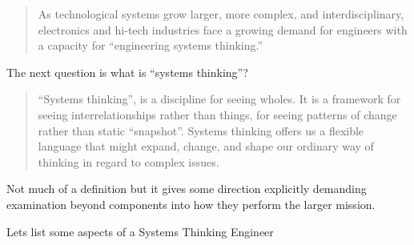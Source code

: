 \documentclass[11pt]{article}
\begin{document}
\begin{quote}
As technological systems grow larger, more complex, and interdisciplinary, electronics and hi-tech industries face a growing demand for engineers with a capacity for ``engineering systems thinking.'' 
\end{quote}
The next question is what is ``systems thinking''?

\begin{quote}``Systems thinking'', is a discipline for seeing wholes. 
It is a framework for seeing interrelationships rather than things, for seeing patterns of change rather than static ``snapshot''.
 Systems thinking offers us a flexible language that might expand, change, and shape our ordinary way of thinking in regard to complex issues.
\end{quote}

Not much of a definition but it gives some direction explicitly demanding examination beyond components into how they perform the larger mission.


Lets list some aspects of a Systems Thinking Engineer  
\end{document}
